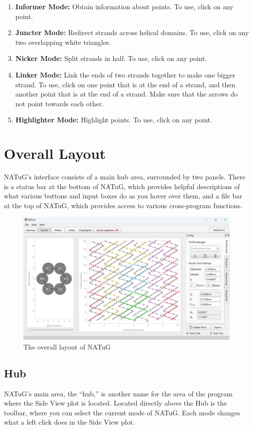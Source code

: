 \documentclass[titlepage]{article}
\begin{document}
\begin{enumerate}
	\item \textbf{Informer Mode:} Obtain information about points. To use, click on any point.
	\item \textbf{Juncter Mode:} Redirect strands across helical domains. To use, click on any two overlapping white triangles.
	\item \textbf{Nicker Mode:} Split strands in half. To use, click on any point.
	\item \textbf{Linker Mode:} Link the ends of two strands together to make one bigger strand. To use, click on one point that is at the end of a strand, and then another point that is at the end of a strand. Make sure that the arrows do not point towards each other.
	\item \textbf{Highlighter Mode:} Highlight points. To use, click on any point.
\end{enumerate}

\section{Overall Layout}

NATuG’s interface consists of a main hub area, surrounded by two panels. There is a status bar at the bottom of NATuG, which provides helpful descriptions of what various buttons and input boxes do as you hover over them, and a file bar at the top of NATuG, which provides access to various cross-program functions.

 \begin{figure}[h] \label{program-layout}
	\centering
	\caption{The overall layout of NATuG}
	\includegraphics[width=5in]{program-layout.png}
\end{figure}

\subsection{Hub}
NATuG's main area, the “hub,” is another name for the area of the program where the Side View plot is located. Located directly above the Hub is the toolbar, where you can select the current mode of NATuG. Each mode changes what a left click does in the Side View plot.
\end{document}
